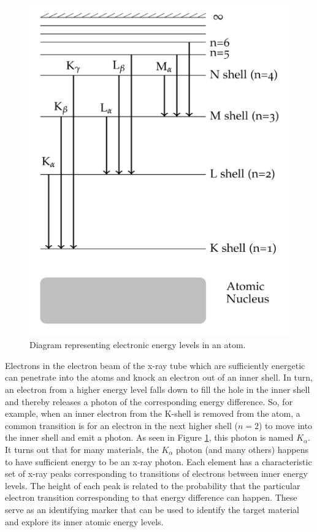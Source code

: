 \begin{figure}[H]
    \centering
    \includegraphics[scale = 0.8]{Images/XR5.PNG}
    \caption{Diagram representing electronic energy levels in an atom.}
    \label{fig:XR5}
\end{figure}

\noindent Electrons in the electron beam of the x-ray tube which are sufficiently energetic can penetrate into the atoms and knock an electron out of an inner shell. In turn, an electron from a higher energy level falls down to fill the hole in the inner shell and thereby releases a photon of the corresponding energy difference. So, for example, when an inner electron from the K-shell is removed from the atom, a common transition is for an electron in the next higher shell ($n = 2$) to move into the inner shell and emit a photon. As seen in Figure \ref{fig:XR5}, this photon is named $K_{\alpha}$. It turns out that for many materials, the $K_{\alpha}$ photon (and many others) happens to have sufficient energy to be an x-ray photon. Each element has a characteristic set of x-ray peaks corresponding to transitions of electrons between inner energy levels. The height of each peak is related to the probability that the particular electron transition corresponding to that energy difference can happen. These  serve as an identifying marker that can be used to identify the target material and explore its inner atomic energy levels.

